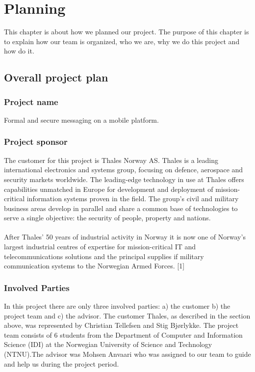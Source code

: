 \chapter{Planning}

This chapter is about how we planned our project. The purpose of this chapter is to explain how our team is organized, who we are, why we do this project and how do it.

\section{Overall project plan}

\subsection{Project name}
Formal and secure messaging on a mobile platform.

\subsection{Project sponsor}

The customer for this project is Thales Norway AS. Thales is a leading international electronics and systems group, focusing on defence, aerospace and security markets worldwide. The leading-edge technology in use at Thales offers capabilities unmatched in Europe for development and deployment of mission-critical information systems proven in the field. The group’s civil and military business areas develop in parallel and share a common base of technologies to serve a single objective: the security of people, property and nations.
\\
\\
After Thales’ 50 years of industrial activity in Norway it is now one of Norway’s largest industrial centres of expertise for mission-critical IT and telecommunications solutions and the principal supplies if military communication systems to the Norwegian Armed Forces. [1]

\subsection{Involved Parties}

In this project there are only three involved parties: a) the customer b) the project team and c) the advisor. The customer Thales, as described in the section above, was represented by Christian Tellefsen and Stig Bjørlykke. The project team consists of 6 students from the Department of Computer and Information Science (IDI) at the Norwegian University of Science and Technology (NTNU).The advisor was Mohsen Anvaari who was assigned to our team to guide and help us during the project period.

